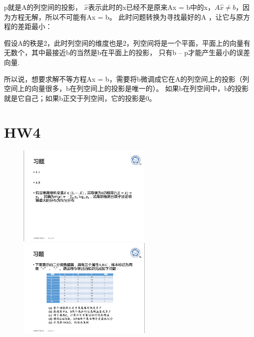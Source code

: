 \documentclass[UTF8,a4paper,AutoFakeBold,AutoFakeSlant]{article}
\begin{document}
p就是A的列空间的投影， $\hat{x}$表示此时的x已经不是原来Ax = b中的x，$A\hat{x}\neq  b$，因为方程无解，所以不可能有Ax = b。
此时问题转换为寻找最好的A ，让它与原方程的差距最小：

假设A的秩是2，此时列空间的维度也是2，列空间将是一个平面，平面上的向量有无数个，其中最接近b的当然是b在平面上的投影，
只有b – p才能产生最小的误差向量.

所以说，想要求解不等方程Ax = b，需要将b微调成它在A的列空间上的投影（列空间上的向量很多，b在列空间上的投影是唯一的）。
如果b在列空间中，b的投影就是它自己；如果b正交于列空间，它的投影是0。






\section{HW4}

\begin{figure}[H]
  \centering
  \begin{minipage}[t]{0.48\textwidth}
    \centering
    \includegraphics[width=6.5cm]{hw4.1.png}
  \end{minipage}
  \begin{minipage}[t]{0.48\textwidth}
    \centering
    \includegraphics[width=6.5cm]{hw4.2.png}
  \end{minipage}
\end{figure}
\end{document}
